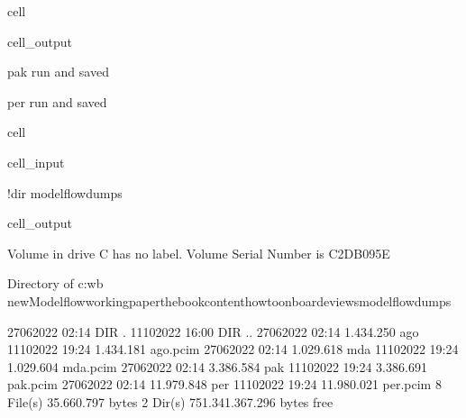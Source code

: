 \documentclass[letterpaper,10pt,english]{jupyterBook}
\begin{document}
\begin{sphinxuseclass}{cell}
\begin{sphinxVerbatimOutput}
\begin{sphinxuseclass}{cell_output}
\begin{sphinxVerbatim}[commandchars=\\\{\}]
pak run and saved
\end{sphinxVerbatim}

\begin{sphinxVerbatim}[commandchars=\\\{\}]
per run and saved
\end{sphinxVerbatim}

\end{sphinxuseclass}\end{sphinxVerbatimOutput}

\end{sphinxuseclass}
\begin{sphinxuseclass}{cell}\begin{sphinxVerbatimInput}

\begin{sphinxuseclass}{cell_input}
\begin{sphinxVerbatim}[commandchars=\\\{\}]
!dir modelflowdumps\PYGZbs{}
\end{sphinxVerbatim}

\end{sphinxuseclass}\end{sphinxVerbatimInput}
\begin{sphinxVerbatimOutput}

\begin{sphinxuseclass}{cell_output}
\begin{sphinxVerbatim}[commandchars=\\\{\}]
 Volume in drive C has no label.
 Volume Serial Number is C2DB\PYGZhy{}095E

 Directory of c:\PYGZbs{}wb new\PYGZbs{}Modelflow\PYGZbs{}working\PYGZus{}paper\PYGZbs{}thebook\PYGZbs{}content\PYGZbs{}howto\PYGZbs{}onboard\PYGZbs{}eviews\PYGZbs{}modelflowdumps

27\PYGZhy{}06\PYGZhy{}2022  02:14    \PYGZlt{}DIR\PYGZgt{}          .
11\PYGZhy{}10\PYGZhy{}2022  16:00    \PYGZlt{}DIR\PYGZgt{}          ..
27\PYGZhy{}06\PYGZhy{}2022  02:14         1.434.250 ago
11\PYGZhy{}10\PYGZhy{}2022  19:24         1.434.181 ago.pcim
27\PYGZhy{}06\PYGZhy{}2022  02:14         1.029.618 mda
11\PYGZhy{}10\PYGZhy{}2022  19:24         1.029.604 mda.pcim
27\PYGZhy{}06\PYGZhy{}2022  02:14         3.386.584 pak
11\PYGZhy{}10\PYGZhy{}2022  19:24         3.386.691 pak.pcim
27\PYGZhy{}06\PYGZhy{}2022  02:14        11.979.848 per
11\PYGZhy{}10\PYGZhy{}2022  19:24        11.980.021 per.pcim
               8 File(s)     35.660.797 bytes
               2 Dir(s)  751.341.367.296 bytes free
\end{sphinxVerbatim}

\end{sphinxuseclass}\end{sphinxVerbatimOutput}

\end{sphinxuseclass}
\end{document}
